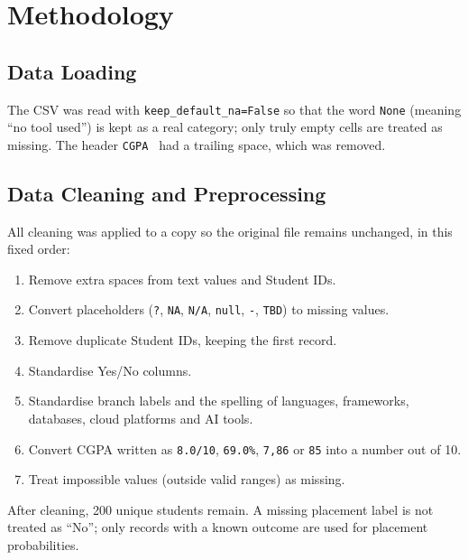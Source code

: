 \documentclass[12pt,a4paper]{article}
\begin{document}
\section{Methodology}
\subsection{Data Loading}
The CSV was read with \texttt{keep\_default\_na=False} so that the word \texttt{None} (meaning ``no tool used'') is kept as a real category; only truly empty cells are treated as missing. The header \texttt{CGPA } had a trailing space, which was removed.

\subsection{Data Cleaning and Preprocessing}
All cleaning was applied to a copy so the original file remains unchanged, in this fixed order:
\begin{enumerate}[noitemsep]
  \item Remove extra spaces from text values and Student IDs.
  \item Convert placeholders (\texttt{?}, \texttt{NA}, \texttt{N/A}, \texttt{null}, \texttt{-}, \texttt{TBD}) to missing values.
  \item Remove duplicate Student IDs, keeping the first record.
  \item Standardise Yes/No columns.
  \item Standardise branch labels and the spelling of languages, frameworks, databases, cloud platforms and AI tools.
  \item Convert CGPA written as \texttt{8.0/10}, \texttt{69.0\%}, \texttt{7,86} or \texttt{85} into a number out of 10.
  \item Treat impossible values (outside valid ranges) as missing.
\end{enumerate}
After cleaning, 200 unique students remain. A missing placement label is not treated as ``No''; only records with a known outcome are used for placement probabilities.
\end{document}
